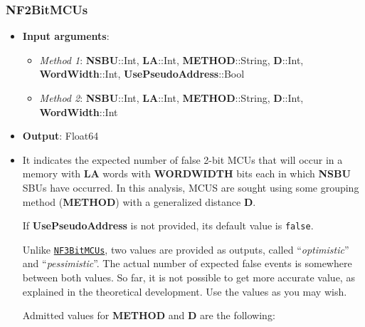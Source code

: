 \subsubsection*{NF2BitMCUs}\label{Fun:NF2BitMCUs}
%
\begin{itemize}
	\item \textbf{Input arguments}: 
	\begin{itemize}
		\item \textit{Method 1}: \textbf{NSBU}::Int, \textbf{LA}::Int, \textbf{METHOD}::String, \textbf{D}::Int, \textbf{WordWidth}::Int, \textbf{UsePseudoAddress}::Bool
		\item \textit{Method 2}: \textbf{NSBU}::Int, \textbf{LA}::Int, \textbf{METHOD}::String, \textbf{D}::Int, \textbf{WordWidth}::Int
	\end{itemize}
	\item \textbf{Output}: Float64
	\item It indicates the expected number of false 2-bit MCUs that will occur 
	in a memory with \textbf{LA} words with \textbf{WORDWIDTH} bits each in which \textbf{NSBU} SBUs have occurred. In this analysis, 
	MCUS are sought using some grouping method (\textbf{METHOD}) with a generalized distance \textbf{D}.
	
	If \textbf{UsePseudoAddress} is not provided, its default value is \texttt{false}.
	
	Unlike \hyperref[Fun:NF3BitMCUs]{\texttt{NF3BitMCUs}}, two values are provided as outputs, called  ``\textit{optimistic}'' and ``\textit{pessimistic}''. The actual number of expected false events is somewhere between both values. So far, it is not possible to get  more accurate value, as explained in the theoretical development. Use the values as you may wish.
	
	Admitted values for \textbf{METHOD} and \textbf{D} are the following:
	

\end{itemize}
